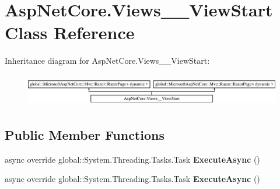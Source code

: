 \hypertarget{class_asp_net_core_1_1_views_____view_start}{}\section{Asp\+Net\+Core.\+Views\+\_\+\+\_\+\+View\+Start Class Reference}
\label{class_asp_net_core_1_1_views_____view_start}
Inheritance diagram for Asp\+Net\+Core.\+Views\+\_\+\+\_\+\+View\+Start\+:\begin{figure}[H]
\begin{center}
\leavevmode
\includegraphics[height=1.432225cm]{class_asp_net_core_1_1_views_____view_start}
\end{center}
\end{figure}
\subsection*{Public Member Functions}
\begin{DoxyCompactItemize}
\item 
\mbox{\label{class_asp_net_core_1_1_views_____view_start_ab3395816bd37d1d7f8ed1bceafaab28f}} 
async override global\+::\+System.\+Threading.\+Tasks.\+Task {\bfseries Execute\+Async} ()
\item 
\mbox{\label{class_asp_net_core_1_1_views_____view_start_ab3395816bd37d1d7f8ed1bceafaab28f}} 
async override global\+::\+System.\+Threading.\+Tasks.\+Task {\bfseries Execute\+Async} ()
\end{DoxyCompactItemize}
